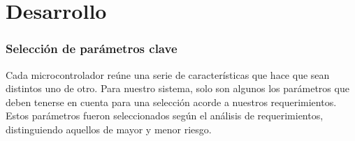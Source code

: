 
\section{Desarrollo} %
\label{it1:sec:desarrollo}


\subsubsection{Selección de parámetros clave} %
\label{ssub:seleccion_de_parametros_clave}

Cada microcontrolador reúne una serie de características que hace que sean distintos uno de otro. Para nuestro sistema, solo son algunos los parámetros que deben tenerse en cuenta para una selección acorde a nuestros requerimientos. Estos parámetros fueron seleccionados según el análisis de requerimientos, distinguiendo aquellos de mayor y menor riesgo. 

